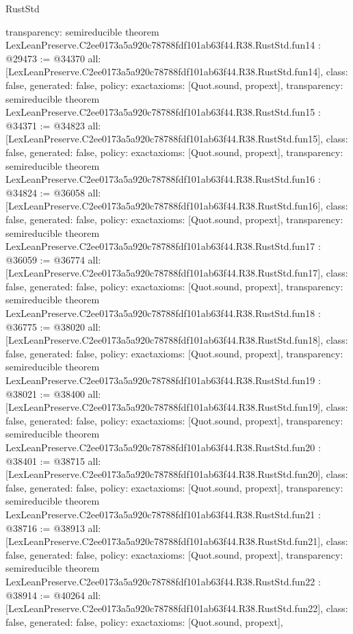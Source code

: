\begin{lexlean}{RustStd}
\begin{coremodule}
{  transparency: semireducible
}
theorem LexLeanPreserve.C2ee0173a5a920c78788fdf101ab63f44.R38.RustStd.fun14 : @29473 := @34370 {
  all: [LexLeanPreserve.C2ee0173a5a920c78788fdf101ab63f44.R38.RustStd.fun14],
  class: false,
  generated: false,
  policy: exact{axioms: [Quot.sound, propext]},
  transparency: semireducible
}
theorem LexLeanPreserve.C2ee0173a5a920c78788fdf101ab63f44.R38.RustStd.fun15 : @34371 := @34823 {
  all: [LexLeanPreserve.C2ee0173a5a920c78788fdf101ab63f44.R38.RustStd.fun15],
  class: false,
  generated: false,
  policy: exact{axioms: [Quot.sound, propext]},
  transparency: semireducible
}
theorem LexLeanPreserve.C2ee0173a5a920c78788fdf101ab63f44.R38.RustStd.fun16 : @34824 := @36058 {
  all: [LexLeanPreserve.C2ee0173a5a920c78788fdf101ab63f44.R38.RustStd.fun16],
  class: false,
  generated: false,
  policy: exact{axioms: [Quot.sound, propext]},
  transparency: semireducible
}
theorem LexLeanPreserve.C2ee0173a5a920c78788fdf101ab63f44.R38.RustStd.fun17 : @36059 := @36774 {
  all: [LexLeanPreserve.C2ee0173a5a920c78788fdf101ab63f44.R38.RustStd.fun17],
  class: false,
  generated: false,
  policy: exact{axioms: [Quot.sound, propext]},
  transparency: semireducible
}
theorem LexLeanPreserve.C2ee0173a5a920c78788fdf101ab63f44.R38.RustStd.fun18 : @36775 := @38020 {
  all: [LexLeanPreserve.C2ee0173a5a920c78788fdf101ab63f44.R38.RustStd.fun18],
  class: false,
  generated: false,
  policy: exact{axioms: [Quot.sound, propext]},
  transparency: semireducible
}
theorem LexLeanPreserve.C2ee0173a5a920c78788fdf101ab63f44.R38.RustStd.fun19 : @38021 := @38400 {
  all: [LexLeanPreserve.C2ee0173a5a920c78788fdf101ab63f44.R38.RustStd.fun19],
  class: false,
  generated: false,
  policy: exact{axioms: [Quot.sound, propext]},
  transparency: semireducible
}
theorem LexLeanPreserve.C2ee0173a5a920c78788fdf101ab63f44.R38.RustStd.fun20 : @38401 := @38715 {
  all: [LexLeanPreserve.C2ee0173a5a920c78788fdf101ab63f44.R38.RustStd.fun20],
  class: false,
  generated: false,
  policy: exact{axioms: [Quot.sound, propext]},
  transparency: semireducible
}
theorem LexLeanPreserve.C2ee0173a5a920c78788fdf101ab63f44.R38.RustStd.fun21 : @38716 := @38913 {
  all: [LexLeanPreserve.C2ee0173a5a920c78788fdf101ab63f44.R38.RustStd.fun21],
  class: false,
  generated: false,
  policy: exact{axioms: [Quot.sound, propext]},
  transparency: semireducible
}
theorem LexLeanPreserve.C2ee0173a5a920c78788fdf101ab63f44.R38.RustStd.fun22 : @38914 := @40264 {
  all: [LexLeanPreserve.C2ee0173a5a920c78788fdf101ab63f44.R38.RustStd.fun22],
  class: false,
  generated: false,
  policy: exact{axioms: [Quot.sound, propext]},
}
\end{coremodule}
\end{lexlean}
